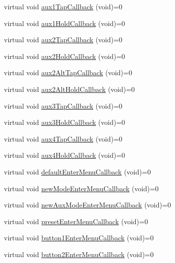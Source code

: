 \begin{DoxyCompactItemize}
\item 
virtual void \mbox{\hyperlink{class_via_u_i_a2942ec6f7d495159258e1f1803e62c4d}{aux1\+Tap\+Callback}} (void)=0
\item 
virtual void \mbox{\hyperlink{class_via_u_i_a6fcc3b7cf9b97ccf403ed1817cb10d1d}{aux1\+Hold\+Callback}} (void)=0
\item 
virtual void \mbox{\hyperlink{class_via_u_i_ae5e009dc22002f62e6bff8dd76d2f745}{aux2\+Tap\+Callback}} (void)=0
\item 
virtual void \mbox{\hyperlink{class_via_u_i_a42545b69c2bbbb036f633140fd8007d6}{aux2\+Hold\+Callback}} (void)=0
\item 
virtual void \mbox{\hyperlink{class_via_u_i_ad13d74c0bd271b83b8da662b22713ddb}{aux2\+Alt\+Tap\+Callback}} (void)=0
\item 
virtual void \mbox{\hyperlink{class_via_u_i_ab93989ef608d1b63b854b54278006f49}{aux2\+Alt\+Hold\+Callback}} (void)=0
\item 
virtual void \mbox{\hyperlink{class_via_u_i_a29026efd361a615374adce2462aa652a}{aux3\+Tap\+Callback}} (void)=0
\item 
virtual void \mbox{\hyperlink{class_via_u_i_a9ea505dfd800b261beabe8dc47b201d3}{aux3\+Hold\+Callback}} (void)=0
\item 
virtual void \mbox{\hyperlink{class_via_u_i_a0a43c527f027d11b266080d8cacb1d65}{aux4\+Tap\+Callback}} (void)=0
\item 
virtual void \mbox{\hyperlink{class_via_u_i_a884790ab6dac8e6f49104146ff620512}{aux4\+Hold\+Callback}} (void)=0
\item 
virtual void \mbox{\hyperlink{class_via_u_i_a226eb7b65b6035a611dd734d965fa7c2}{default\+Enter\+Menu\+Callback}} (void)=0
\item 
virtual void \mbox{\hyperlink{class_via_u_i_a2ebd72eaa0d26437d2c6320eb5fdf3e4}{new\+Mode\+Enter\+Menu\+Callback}} (void)=0
\item 
virtual void \mbox{\hyperlink{class_via_u_i_a6fdbe125cd3652807631631edc636d39}{new\+Aux\+Mode\+Enter\+Menu\+Callback}} (void)=0
\item 
virtual void \mbox{\hyperlink{class_via_u_i_ad4dfd9fa424267358cab83bec4ee1f23}{preset\+Enter\+Menu\+Callback}} (void)=0
\item 
virtual void \mbox{\hyperlink{class_via_u_i_ae00249c10af94437c357222328a56f82}{button1\+Enter\+Menu\+Callback}} (void)=0
\item 
virtual void \mbox{\hyperlink{class_via_u_i_ac7b7f919edba9a640e7009e1f9303a2d}{button2\+Enter\+Menu\+Callback}} (void)=0

\end{DoxyCompactItemize}
